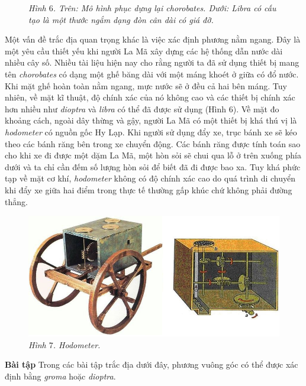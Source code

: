 \begin{multicols}{2}
\begin{figure}[H]
		\caption{\small\textit{\color{toanhocdoisong}Hình $6$. Trên: Mô hình phục dựng lại chorobates. Dưới: Libra có cấu tạo là một thước ngắm dạng đòn cân dài có giá đỡ.}}
		\vspace*{-10pt}
	\end{figure}
	Một vấn đề trắc địa quan trọng khác là việc xác định phương nằm ngang. Đây là một yêu cầu thiết yếu khi người La Mã xây dựng các hệ thống dẫn nước dài nhiều cây số. Nhiều tài liệu hiện nay cho rằng người ta đã sử dụng thiết bị mang tên \textit{chorobates} có dạng một ghế băng dài với một máng khoét ở giữa có đổ nước. Khi mặt ghế hoàn toàn nằm ngang, mực nước sẽ ở đều cả hai bên máng. Tuy nhiên, về mặt kĩ thuật, độ chính xác của nó không cao và các thiết bị chính xác hơn nhiều như \textit{dioptra} và \textit{libra} có thể đã được sử dụng (Hình $6$). 
	\vskip 0.1cm
	Về mặt đo khoảng cách, ngoài dây thừng và gậy, người La Mã có một thiết bị khá thú vị là \textit{hodometer} có nguồn gốc Hy Lạp. Khi người sử dụng đẩy xe, trục bánh xe sẽ kéo theo các bánh răng bên trong xe chuyển động. Các bánh răng được tính toán sao cho khi xe đi được một dặm La Mã, một hòn sỏi sẽ chui qua lỗ ở trên xuống phía dưới và ta chỉ cần đếm số lượng hòn sỏi để biết đã đi được bao xa. Tuy khá phức tạp về mặt cơ khí, \textit{hodometer} không có độ chính xác cao do quá trình di chuyển khi đẩy xe giữa hai điểm trong thực tế thường gấp khúc chứ không phải đường thẳng.
	\begin{figure}[H]
		\vspace*{-5pt}
		\centering
		\captionsetup{labelformat= empty, justification=centering}
		\includegraphics[width= 1\linewidth]{7}
		\caption{\small\textit{\color{toanhocdoisong}Hình $7$. Hodometer.}}
		\vspace*{-10pt}
	\end{figure}
	\textbf{\color{toanhocdoisong}Bài tập}
	\vskip 0.1cm
	Trong các bài tập trắc địa dưới đây, phương vuông góc có thể được xác định bằng \textit{groma} hoặc \textit{dioptra}.

\end{multicols}

